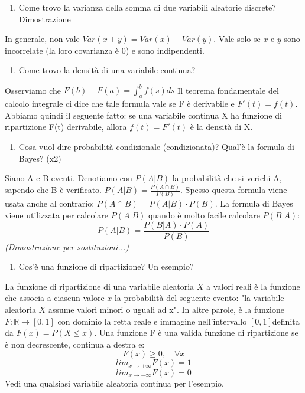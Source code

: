 \begin{enumerate}[resume]\bfseries
\item Come trovo la varianza della somma di due variabili aleatorie discrete? Dimostrazione
\end{enumerate}
In generale, non vale $Var(x+y) = Var(x) + Var(y)$. Vale solo se $x$ e $y$ sono incorrelate (la loro covarianza è 0) e sono indipendenti.
\begin{enumerate}[resume]\bfseries
\item Come trovo la densità di una variabile continua?
\end{enumerate}
Osserviamo che
$F(b) - F(a) = \int_{a}^{b} f(s) ds$
Il teorema fondamentale del calcolo integrale ci dice che tale formula vale se F è derivabile e $F'(t) = f(t)$.
Abbiamo quindi il seguente fatto: se una variabile continua X ha funzione di ripartizione F(t) derivabile, allora $f(t) = F'(t)$ è la densità di X.
\begin{enumerate}[resume]\bfseries
\item Cosa vuol dire probabilità condizionale (condizionata)? Qual'è la formula di Bayes? (x2)
\end{enumerate}
Siano A e B eventi. Denotiamo con $P(A|B)$ la probabilità che si verichi A, sapendo che B è verificato.\newline
$P(A|B) = \frac{P(A \cap B)}{P(B)}$.
Spesso questa formula viene usata anche al contrario: \newline $P(A \cap B) = P(A|B) \cdot P(B)$.
La formula di Bayes viene utilizzata per calcolare $P(A|B)$ quando è molto facile calcolare $P(B|A)$:
\[P(A|B)  = \frac{P(B|A) \cdot P(A) }{P(B)}\]
\textit{(Dimostrazione per sostituzioni...)}
\begin{enumerate}[resume]\bfseries
\item Cos'è una funzione di ripartizione? Un esempio?
\end{enumerate}
La funzione di ripartizione di una variabile aleatoria $X$ a valori reali è la funzione che associa a ciascun valore $x$ la probabilità del seguente evento: "la variabile aleatoria $X$ assume valori minori o uguali ad x".\newline
In altre parole, è la funzione $ F\colon \mathbb{R} \to [0,1] $ con dominio la retta reale e immagine nell'intervallo $[0,1] $definita da
$F(x)=P(X\leq x)$.
Una funzione F è una valida funzione di ripartizione se è non decrescente, continua a destra e:
\[F(x)\geq 0,\quad \forall x\]
\[lim _{{x\to +\infty }}F(x)=1\]
\[lim _{{x\to -\infty }}F(x)=0\]
Vedi una qualsiasi variabile aleatoria continua per l'esempio.
